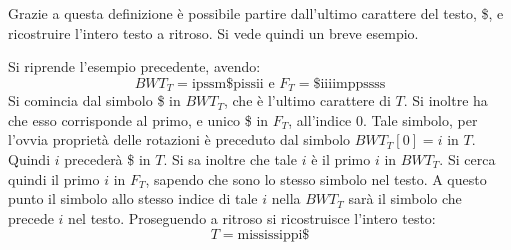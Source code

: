 Grazie a questa definizione è possibile partire dall'ultimo carattere del testo,
\$, e ricostruire l'intero testo a ritroso. Si vede quindi un breve esempio.
\begin{esempio}
  Si riprende l'esempio precedente, avendo:
  \[BWT_T=\mbox{ipssm\$pissii}\mbox{ e }F_T=\mbox{\$iiiimppssss}\]
  Si comincia dal simbolo \$ in $BWT_T$, che è l'ultimo carattere di $T$. Si
  inoltre ha che esso corrisponde al primo, e unico \$ in $F_T$, all'indice
  $0$. Tale simbolo, per l'ovvia proprietà delle rotazioni è preceduto dal
  simbolo $BWT_T[0]=i$ in $T$. Quindi $i$ precederà \$ in $T$. Si sa inoltre che
  tale $i$ è il primo $i$ in $BWT_T$. Si cerca quindi il primo $i$ in $F_T$,
  sapendo che sono lo stesso simbolo nel testo. A questo punto il simbolo allo
  stesso indice di tale $i$ nella $BWT_T$ sarà il simbolo che precede $i$ nel
  testo. Proseguendo a ritroso si ricostruisce l'intero testo:
  \[T=\mbox{mississippi\$}\]
\end{esempio}
